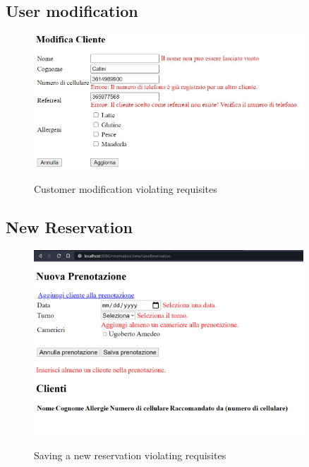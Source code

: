 \documentclass{article}
\begin{document}
    \vspace*{5mm}

    \subsection*{User modification}
    \begin{figure}[H]
        \centering
        \includegraphics[width=0.9\textwidth]{images/customer_validation_error.jpg}
        \label{fig:customer_validation_error}
        \caption{Customer modification violating requisites}
    \end{figure}

    \vspace*{5mm}

    \subsection*{New Reservation}
    \label{sec:new_reservation_form_errors}
    \begin{figure}[H]
        \centering
        \includegraphics[width=0.9\textwidth]{images/new_reservation_form_errors}
        \label{fig:new_reservation_form_errors}
        \caption{Saving a new reservation violating requisites}
    \end{figure}
\end{document}
